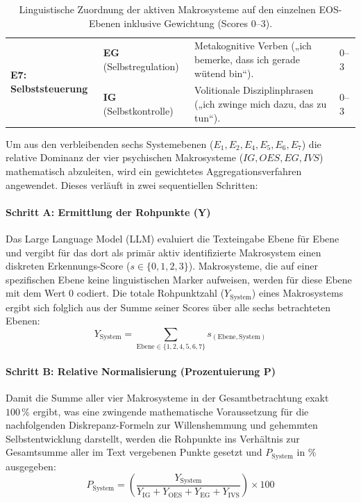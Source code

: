 \begin{table}[htbp]
\begin{tabularx}{\textwidth}{l p{2.2cm} X l}
\multirow{2}{*}{\textbf{E7: Selbststeuerung}} 
& \textbf{EG} (Selbstregulation) & Metakognitive Verben („ich bemerke, dass ich gerade wütend bin“). & 0--3 \\
& \textbf{IG} (Selbstkontrolle) & Volitionale Disziplinphrasen („ich zwinge mich dazu, das zu tun“). & 0--3 \\
\hline

\end{tabularx}
\caption{Linguistische Zuordnung der aktiven Makrosysteme auf den einzelnen EOS-Ebenen inklusive Gewichtung (Scores 0--3).}
\label{tab:psi_eos_ebenen_parser}
\end{table}

Um aus den verbleibenden sechs Systemebenen ($E_1, E_2, E_4, E_5, E_6, E_7$) die relative Dominanz der vier psychischen Makrosysteme ($IG, OES, EG, IVS$) mathematisch abzuleiten, wird ein gewichtetes Aggregationsverfahren angewendet. Dieses verläuft in zwei sequentiellen Schritten:

\paragraph{Schritt A: Ermittlung der Rohpunkte ($\boldsymbol{Y}$)}
Das Large Language Model (LLM) evaluiert die Texteingabe Ebene für Ebene und vergibt für das dort als primär aktiv identifizierte Makrosystem einen diskreten Erkennungs-Score ($s \in \{0, 1, 2, 3\}$). Makrosysteme, die auf einer spezifischen Ebene keine linguistischen Marker aufweisen, werden für diese Ebene mit dem Wert $0$ codiert. Die totale Rohpunktzahl ($Y_{\text{System}}$) eines Makrosystems ergibt sich folglich aus der Summe seiner Scores über alle sechs betrachteten Ebenen:
\begin{equation}
    Y_{\text{System}} = \sum_{\text{Ebene} \in \{1,2,4,5,6,7\}} s_{(\text{Ebene}, \text{System})}
\end{equation}

\paragraph{Schritt B: Relative Normalisierung (Prozentuierung $\boldsymbol{P}$)}
Damit die Summe aller vier Makrosysteme in der Gesamtbetrachtung exakt $100\,\%$ ergibt, was eine zwingende mathematische Voraussetzung für die nachfolgenden Diskrepanz-Formeln zur Willenshemmung und gehemmten Selbstentwicklung darstellt, werden die Rohpunkte ins Verhältnis zur Gesamtsumme aller im Text vergebenen Punkte gesetzt und $P_{\text{System}}$ in \% ausgegeben:
\begin{equation}
    P_{\text{System}} = \left( \frac{Y_{\text{System}}}{Y_{\text{IG}} + Y_{\text{OES}} + Y_{\text{EG}} + Y_{\text{IVS}}} \right) \times 100
\end{equation}

